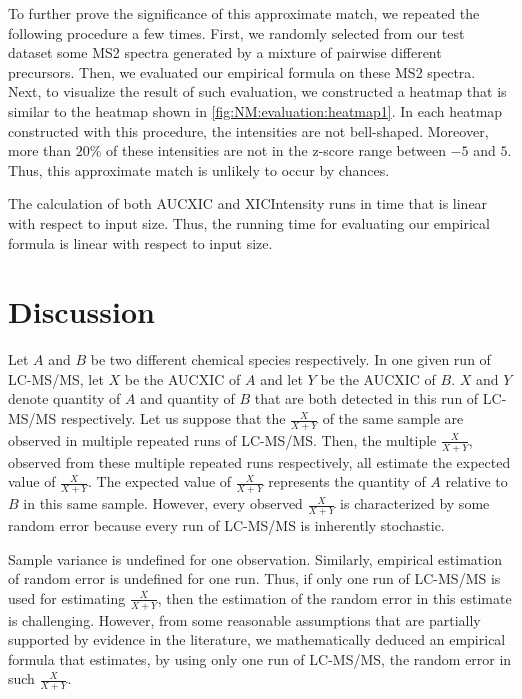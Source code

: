 To further prove the significance of this approximate match, we repeated the following procedure a few times.
First, we randomly selected from our test dataset some \gls{MS2} spectra generated by a mixture of pairwise different precursors.
Then, we evaluated our empirical formula on these \gls{MS2} spectra.
Next, to visualize the result of such evaluation, we constructed a heatmap that is similar to the heatmap shown in \cref{fig:NM:evaluation:heatmap1}.
In each heatmap constructed with this procedure, the intensities are not bell-shaped.
Moreover, more than \(20\%\) of these intensities are not in the z-score range between \(-5\) and \(5\).
Thus, this approximate match is unlikely to occur by chances.	

The calculation of both \gls{AUCXIC} and \gls{XICIntensity} runs in time that is linear with respect to input size.
Thus, the running time for evaluating our empirical formula is linear with respect to input size.

\section{Discussion}

Let \(A\) and \(B\) be two different chemical species respectively.{}
In one given run of \gls{LC-MS/MS}, let \(X\) be the \gls{AUCXIC} of \(A\) and let \(Y\) be the \gls{AUCXIC} of \(B\).
\(X\) and \(Y\) denote quantity of \(A\) and quantity of \(B\) that are both detected in this run of \gls{LC-MS/MS} respectively.
Let us suppose that the \(\frac{X}{X+Y}\) of the same sample are observed in multiple repeated runs of \gls{LC-MS/MS}.
Then, the multiple \(\frac{X}{X+Y}\), observed from these multiple repeated runs respectively, all estimate the expected value of \(\frac{X}{X+Y}\). 
The expected value of \(\frac{X}{X+Y}\) represents the quantity of \(A\) relative to \(B\) in this same sample.
However, every observed \(\frac{X}{X+Y}\) is characterized by some random error because every run of \gls{LC-MS/MS} is inherently stochastic.

Sample variance is undefined for one observation.
Similarly, empirical estimation of random error is undefined for one run.
Thus, if only one run of \gls{LC-MS/MS} is used for estimating \(\frac{X}{X+Y}\), 
	then the estimation of the random error in this estimate is challenging.
However, from some reasonable assumptions that are partially supported by evidence in the literature,
	we mathematically deduced an empirical formula that estimates, by using only one run of \gls{LC-MS/MS}, the random error in such \(\frac{X}{X+Y}\).
	
